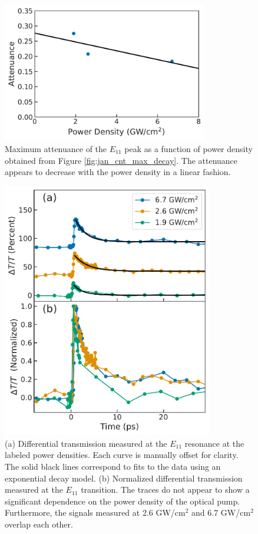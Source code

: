 \begin{figure}[H]
	\centering
	\includegraphics[height=2.4in]{images/chapter_my_data/Jan_CNT_max_attenuance_and_fit}
	\caption{Maximum attenuance of the $E_{11}$ peak as a function of power density obtained from Figure \ref{fig:jan_cnt_max_decay}. The attenuance appears to decrease with the power density in a linear fashion.}
	\label{fig:jan_cnt_max_decay_fit}
\end{figure}

\begin{figure}[ht]
	\centering
	\includegraphics[height=4.4in]{images/chapter_my_data/Jan_CNT_diff_trans_fits_and_normalized}
	\caption{(a) Differential transmission measured at the $E_{11}$ resonance at the labeled power densities. Each curve is manually offset for clarity. The solid black lines correspond to fits to the data using an exponential decay model. (b) Normalized differential transmission measured at the $E_{11}$ transition. The traces do not appear to show a significant dependence on the power density of the optical pump. Furthermore, the signals measured at 2.6 GW/cm$^2$ and 6.7 GW/cm$^2$ overlap each other.}
	\label{fig:jan_cnt_max_normalized_dt}
\end{figure}

